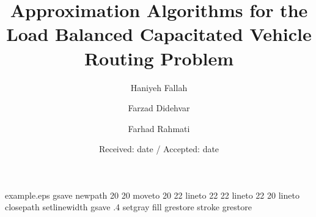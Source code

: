\begin{filecontents*}{example.eps}
gsave
newpath
  20 20 moveto
  20 22 lineto
  22 22 lineto
  22 20 lineto
closepath
setlinewidth
gsave
  .4 setgray fill
 grestore
stroke
grestore
\end{filecontents*}
\RequirePackage{fix-cm}

\documentclass[smallextended]{svjour3}       \smartqed  \raggedbottom
\usepackage{amssymb}
\usepackage{graphicx}
\usepackage[inner=2.5cm,outer=2cm]{geometry}
\usepackage{algorithm}
\usepackage{algpseudocode}
\usepackage{algpascal}


\title{Approximation Algorithms for the Load Balanced Capacitated Vehicle Routing Problem}





\author{Haniyeh Fallah  \and
        Farzad Didehvar  \and
        Farhad Rahmati  }





\date{Received: date / Accepted: date}



